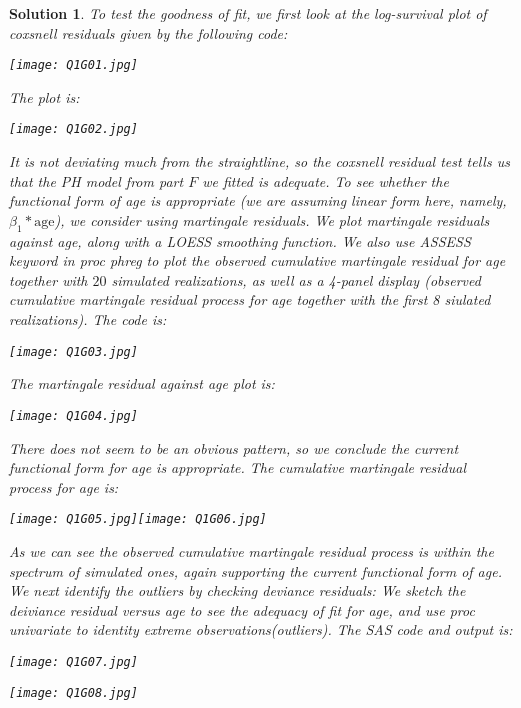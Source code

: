 \documentclass[11pt]{article}
\newtheorem{sol}{Solution}
\begin{document}
\begin{sol}
	To test the goodness of fit, we first look at the log-survival plot of coxsnell residuals given by the following code:
	\begin{center}
		\texttt{[image: Q1G01.jpg]}
	\end{center}
	The plot is:
	\begin{center}
		\texttt{[image: Q1G02.jpg]}
	\end{center}
	It is not deviating much from the straightline, so the coxsnell residual test tells us that the PH model from part $F$ we fitted is adequate.\vskip 2mm
	To see whether the functional form of age is appropriate (we are assuming linear form here, namely, $\beta_1 \ast \text{age}$), we consider using martingale residuals. We plot martingale residuals against age, along with a LOESS smoothing function. We also use ASSESS keyword in proc phreg to plot the observed cumulative martingale residual for age together with $20$ simulated realizations, as well as a 4-panel display (observed cumulative martingale residual process for age together with the first 8 siulated realizations).\vskip 2mm
	The code is:
	 \begin{center}
		\texttt{[image: Q1G03.jpg]}
	\end{center}
	The martingale residual against age plot is:
	 \begin{center}
		\texttt{[image: Q1G04.jpg]}
	\end{center}
	There does not seem to be an obvious pattern, so we conclude the current functional form for age is appropriate.\vskip 2mm
	The cumulative martingale residual process for age is:
	 \begin{center}
		\texttt{[image: Q1G05.jpg]}\texttt{[image: Q1G06.jpg]}
	\end{center}
	As we can see the observed cumulative martingale residual process is within the spectrum of simulated ones, again supporting the current functional form of age.\vskip 2mm
	We next identify the outliers by checking deviance residuals:\vskip 2mm
	We sketch the deiviance residual versus age to see the adequacy of fit for age, and use proc univariate to identity extreme observations(outliers).\vskip 2mm
	The SAS code and output is:
	\begin{center}
		\texttt{[image: Q1G07.jpg]}
	\end{center}
	\begin{center}
		\texttt{[image: Q1G08.jpg]}
	\end{center}

\end{sol}
\end{document}
